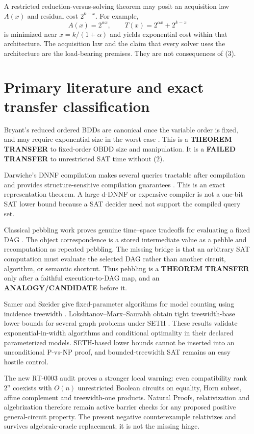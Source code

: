 \documentclass[11pt]{article}
\begin{document}
A restricted reduction-versus-solving theorem may posit an acquisition law
$A(x)$ and residual cost $2^{k-x}$.  For example,
\[
 A(x)=2^{\alpha x},\qquad
 T(x)=2^{\alpha x}+2^{k-x}
\]
is minimized near $x=k/(1+\alpha)$ and yields exponential cost within that
architecture.  The acquisition law and the claim that every solver uses the
architecture are the load-bearing premises.  They are not consequences of
(3).

\section{Primary literature and exact transfer classification}
Bryant's reduced ordered BDDs are canonical once the variable order is fixed,
and may require exponential size in the worst case \cite{bryant}.  This is a
\textbf{THEOREM TRANSFER} to fixed-order OBDD size and manipulation.  It is a
\textbf{FAILED TRANSFER} to unrestricted SAT time without (2).

Darwiche's DNNF compilation makes several queries tractable after compilation
and provides structure-sensitive compilation guarantees \cite{darwiche}.
This is an exact representation theorem.  A large d-DNNF or expensive
compiler is not a one-bit SAT lower bound because a SAT decider need not
support the compiled query set.

Classical pebbling work proves genuine time--space tradeoffs for evaluating a
fixed DAG \cite{tarjan}.  The object correspondence is a stored intermediate
value as a pebble and recomputation as repeated pebbling.  The missing bridge
is that an arbitrary SAT computation must evaluate the selected DAG rather
than another circuit, algorithm, or semantic shortcut.  Thus pebbling is a
\textbf{THEOREM TRANSFER} only after a faithful execution-to-DAG map, and an
\textbf{ANALOGY/CANDIDATE} before it.

Samer and Szeider give fixed-parameter algorithms for model counting using
incidence treewidth \cite{samerszeider}.  Lokshtanov--Marx--Saurabh obtain
tight treewidth-base lower bounds for several graph problems under SETH
\cite{lms}.  These results validate exponential-in-width algorithms and
conditional optimality in their declared parameterized models.  SETH-based
lower bounds cannot be inserted into an unconditional P-vs-NP proof, and
bounded-treewidth SAT remains an easy hostile control.

The new RT-0003 audit proves a stronger local warning: even compatibility
rank $2^n$ coexists with $O(n)$ unrestricted Boolean circuits on equality,
Horn subset, affine complement and treewidth-one products.  Natural Proofs,
relativization and algebrization therefore remain active barrier checks for
any proposed positive general-circuit property.  The present negative
counterexample relativizes and survives algebraic-oracle replacement; it is
not the missing hinge.
\end{document}
